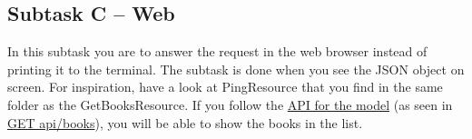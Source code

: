\subsection{Subtask C -- Web}\label{subtask-c-web}

In this subtask you are to answer the request in the web browser instead
of printing it to the terminal. The subtask is done when you see the
JSON object on screen. For inspiration, have a look at PingResource that
you find in the same folder as the GetBooksResource. If you follow the
\href{https://htmlpreview.github.io/?https://github.com/tobias-dv-lnu/1dv600-lab/blob/master/api-specification/api-specification.html}{API
for the model} (as seen in
\href{https://htmlpreview.github.io/?https://github.com/tobias-dv-lnu/1dv600-lab/blob/master/api-specification/api-specification.html\#books-get}{GET
api/books})​, you will be able to show the books in the list.
